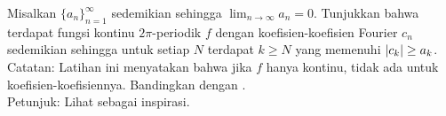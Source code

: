 \begin{exercise}
Misalkan
$\{ a_n \}_{n=1}^\infty$ sedemikian sehingga
$\lim_{n\to \infty} a_n = 0$.  Tunjukkan bahwa terdapat fungsi kontinu
$2\pi$-periodik $f$ dengan koefisien-koefisien Fourier
$c_{n}$
sedemikian sehingga untuk setiap $N$ terdapat $k \geq N$ yang memenuhi $\lvert {c_k} \rvert \geq
a_k$.\\
Catatan: Latihan ini menyatakan bahwa jika $f$ hanya kontinu, tidak ada
 untuk koefisien-koefisiennya.  Bandingkan dengan
.
\\
Petunjuk: Lihat  sebagai inspirasi.
\end{exercise}
